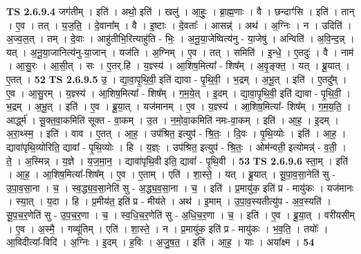 \documentclass[17pt]{extarticle}
\begin{document}
                  \newline
                                \textbf{ TS 2.6.9.4} \newline
                  जग॑तीम् । इति॑ । अथो॒ इति॑ । खलु॑ । आ॒हुः॒ । ब्रा॒ह्म॒णाः । वै । छन्दाꣳ॑सि । इति॑ । तान् । ए॒व । तत् । य॒ज॒ति॒ । दे॒वाना᳚म् । वै । इ॒ष्टाः । दे॒वताः᳚ । आसन्न्॑ । अथ॑ । अ॒ग्निः । न । उदिति॑ । अ॒ज्व॒ल॒त् । तम् । दे॒वाः । आहु॑तीभि॒रित्याहु॑ति - भिः॒ । अ॒नू॒या॒जेष्वित्य॑नु - या॒जेषु॑ । अन्विति॑ । अ॒वि॒न्द॒न्न् । यत् । अ॒नू॒या॒जानित्य॑नु-या॒जान् । यज॑ति । अ॒ग्निम् । ए॒व । तत् । समिति॑ । इ॒न्धे॒ । ए॒तदुः॑ । वै । नाम॑ । आ॒सु॒रः । आ॒सी॒त् । सः । ए॒तर्.हि॑ । य॒ज्ञ्स्य॑ । आ॒शिष॒मित्या᳚ - शिष᳚म् । अ॒वृ॒ङ्क्त॒ । यत् । ब्रू॒यात् । ए॒तत् । \textbf{  52} \newline
                  \newline
                                \textbf{ TS 2.6.9.5} \newline
                  उ॒ । द्या॒वा॒पृ॒थि॒वी॒ इति॑ द्यावा - पृ॒थि॒वी॒ । भ॒द्रम् । अ॒भू॒त् । इति॑ । ए॒तदु᳚म् । ए॒व । आ॒सु॒रम् । य॒ज्ञ्स्य॑ । आ॒शिष॒मित्या᳚ - शिष᳚म् । ग॒म॒ये॒त् । इ॒दम् । द्या॒वा॒पृ॒थि॒वी॒ इति॑ द्यावा - पृ॒थि॒वी॒ । भ॒द्रम् । अ॒भू॒त् । इति॑ । ए॒व । ब्रू॒या॒त् । यज॑मानम् । ए॒व । य॒ज्ञ्स्य॑ । आ॒शिष॒मित्या᳚- शिष᳚म् । ग॒म॒य॒ति॒ । आर्द्ध्म॑ । सू॒क्त॒वा॒कमिति॑ सूक्त - वा॒कम् । उ॒त । न॒मो॒वा॒कमिति॑ नमः-वा॒कम् । इति॑ । आ॒ह॒ । इ॒दम् । अ॒रा॒थ्स्म॒ । इति॑ । वाव । ए॒तत् । आ॒ह॒ । उप॑श्रित॒ इत्युप॑ - श्रि॒तः॒ । दि॒वः । पृ॒थि॒व्योः । इति॑ । आ॒ह॒ । द्यावा॑पृथि॒व्योरिति॒ द्यावा᳚ - पृ॒थि॒व्योः । हि । य॒ज्ञ्ः । उप॑श्रित॒ इत्युप॑ - श्रि॒तः॒ । ओम॑न्वती॒ इत्योमन्न्॑ - व॒ती॒ । ते॒ । अ॒स्मिन्न् । य॒ज्ञे । य॒ज॒मा॒न॒ । द्यावा॑पृथि॒वी इति॒ द्यावा᳚ - पृ॒थि॒वी । \textbf{  53} \newline
                  \newline
                                \textbf{ TS 2.6.9.6} \newline
                  स्ता॒म् । इति॑ । आ॒ह॒ । आ॒शिष॒मित्या᳚-शिष᳚म् । ए॒व । ए॒ताम् । एति॑ । शा॒स्ते॒ । यत् । ब्रू॒यात् । सू॒पा॒व॒सा॒नेति॑ सु - उ॒पा॒व॒सा॒ना । च॒ । स्व॒द्ध्य॒व॒सा॒नेति॑ सु - अ॒द्ध्य॒व॒सा॒ना । च॒ । इति॑ । प्र॒मायु॑क॒ इति॑ प्र - मायु॑कः । यज॑मानः । स्या॒त् । य॒दा । हि । प्र॒मीय॑त॒ इति॑ प्र - मीय॑ते । अथ॑ । इ॒माम् । उ॒पा॒व॒स्यतीत्यु॑प - अ॒व॒स्यति॑ । सू॒प॒च॒र॒णेति॑ सु - उ॒प॒च॒र॒णा । च॒ । स्व॒धि॒च॒र॒णेति॑ सु - अ॒धि॒च॒र॒णा । च॒ । इति॑ । ए॒व । ब्रू॒या॒त् । वरी॑यसीम् । ए॒व । अ॒स्मै॒ । गव्यू॑तिम् । एति॑ । शा॒स्ते॒ । न । प्र॒मायु॑क॒ इति॑ प्र - मायु॑कः । भ॒व॒ति॒ । तयोः᳚ । आ॒विदीत्या᳚-विदि॑ । अ॒ग्निः । इ॒दम् । ह॒विः । अ॒जु॒ष॒त॒ । इति॑ । आ॒ह॒ । याः । अया᳚क्ष्म । \textbf{  54} \newline
\end{document}
